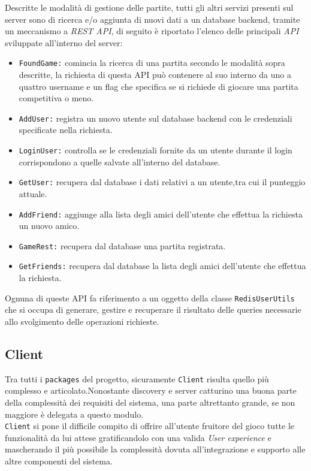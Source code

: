       Descritte le modalità di gestione delle partite, tutti gli altri servizi presenti sul server sono di ricerca e/o aggiunta di nuovi dati a un database backend, tramite un meccanismo a \textit{REST API}, di seguito è riportato l'elenco delle principali \textit{API} sviluppate all'interno del server:
      \begin{itemize}
        \item{\texttt{FoundGame:}} comincia la ricerca di una partita secondo le modalità sopra descritte, la richiesta di questa API può contenere al suo interno da uno a quattro username e un flag che specifica se si richiede di giocare una partita competitiva o meno.

        \item{\texttt{AddUser:}} registra un nuovo utente sul database backend con le credenziali specificate nella richiesta.

        \item{\texttt{LoginUser:}} controlla se le credenziali fornite da un utente durante il login corrispondono a quelle salvate all'interno del database.

        \item{\texttt{GetUser:}} recupera dal database i dati relativi a un utente,tra cui il punteggio attuale.

        \item{\texttt{AddFriend:}} aggiunge alla lista degli amici dell'utente che effettua la richiesta un nuovo amico.

         \item{\texttt{GameRest:}} recupera dal database una partita registrata.

         \item{\texttt{GetFriends:}} recupera dal database la lista degli amici dell'utente che effettua la richiesta.
      \end{itemize}

      Ognuna di queste API fa riferimento a un oggetto della classe \texttt{RedisUserUtils} che si occupa di generare, gestire e recuperare il risultato delle queries necessarie allo svolgimento delle operazioni richieste.

       \subsection {Client}\label{subsec:details:client}
       Tra tutti i \texttt{packages} del progetto, sicuramente \texttt{Client} risulta quello più complesso e articolato.Nonostante discovery e server catturino una buona parte della complessità dei requisiti del sistema, una parte altrettanto grande, se non maggiore è delegata a questo modulo.\\
       \texttt{Client} si pone il difficile compito di offrire all'utente fruitore del gioco tutte le funzionalità da lui attese gratificandolo con una valida \textit{User experience} e mascherando il più possibile la complessità dovuta all'integrazione e supporto alle altre componenti del sistema.

